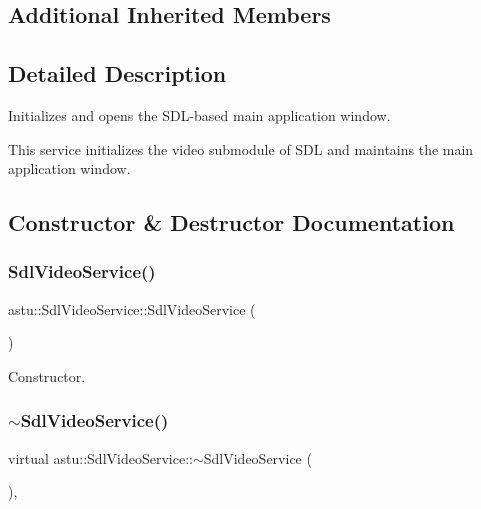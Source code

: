 \subsection*{Additional Inherited Members}


\subsection{Detailed Description}
Initializes and opens the S\+D\+L-\/based main application window.

This service initializes the video submodule of S\+DL and maintains the main application window. 

\subsection{Constructor \& Destructor Documentation}
\mbox{\label{classastu_1_1SdlVideoService_a21f04798e41b0c5c083acc1eefcbb5c1}} 
\subsubsection{\texorpdfstring{Sdl\+Video\+Service()}{SdlVideoService()}}
{\footnotesize\ttfamily astu\+::\+Sdl\+Video\+Service\+::\+Sdl\+Video\+Service (\begin{DoxyParamCaption}{ }\end{DoxyParamCaption})}

Constructor. \mbox{\label{classastu_1_1SdlVideoService_a5ab48fd8569c517151099d71a86cc0b5}} 
\subsubsection{\texorpdfstring{$\sim$\+Sdl\+Video\+Service()}{~SdlVideoService()}}
{\footnotesize\ttfamily virtual astu\+::\+Sdl\+Video\+Service\+::$\sim$\+Sdl\+Video\+Service (\begin{DoxyParamCaption}{ }\end{DoxyParamCaption})\hspace{0.3cm}{\ttfamily [inline]}, {\ttfamily [virtual]}}

